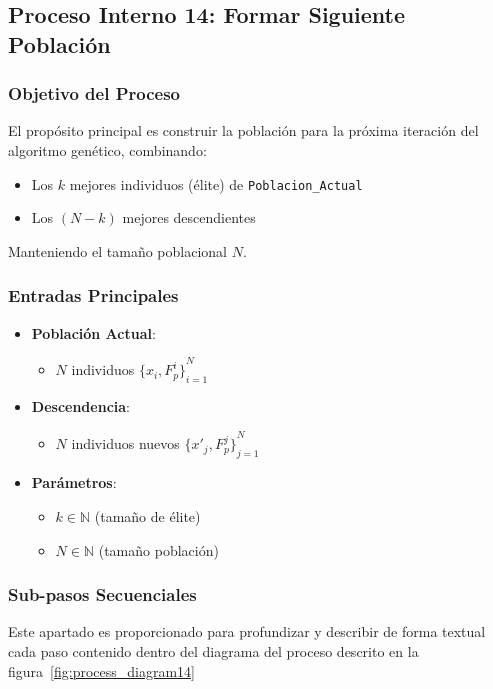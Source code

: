 \subsection{Proceso Interno 14: Formar Siguiente Población}

\subsubsection{Objetivo del Proceso}
El propósito principal es construir la población para la próxima iteración del algoritmo genético, combinando:
\begin{itemize}
    \item Los $k$ mejores individuos (élite) de \texttt{Poblacion\_Actual}
    \item Los $(N - k)$ mejores descendientes
\end{itemize}
Manteniendo el tamaño poblacional $N$.

\subsubsection{Entradas Principales}
\begin{itemize}
    \item \textbf{Población Actual}:
    \begin{itemize}
        \item $N$ individuos ${\{x_i, F_p^i\}}_{i=1}^N$
    \end{itemize}
    \item \textbf{Descendencia}:
    \begin{itemize}
        \item $N$ individuos nuevos ${\{x'_j, F_p^j\}}_{j=1}^N$
    \end{itemize}
    \item \textbf{Parámetros}:
    \begin{itemize}
        \item $k \in \mathbb{N}$ (tamaño de élite)
        \item $N \in \mathbb{N}$ (tamaño población)
    \end{itemize}
\end{itemize}

\subsubsection{Sub-pasos Secuenciales}
Este apartado es proporcionado para profundizar y describir de forma textual cada paso contenido dentro del diagrama del proceso descrito en la figura~\ref{fig:process_diagram14}
